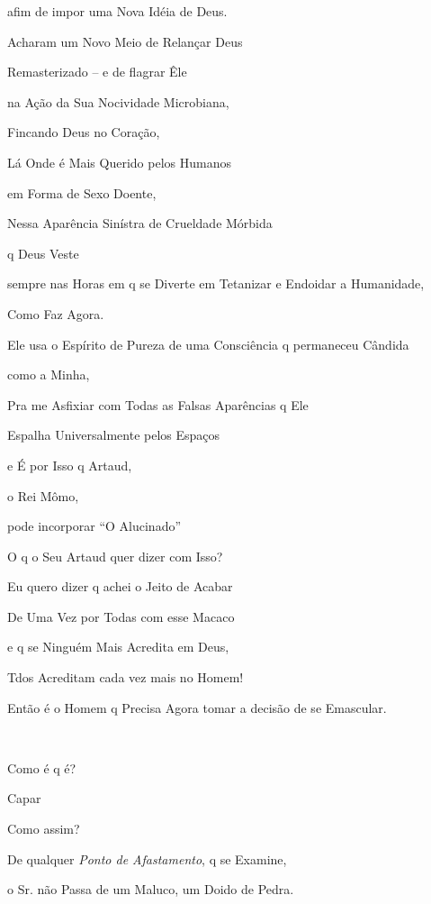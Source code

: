 afim de impor uma Nova Idéia de Deus.

Acharam um Novo Meio de Relançar Deus 

Remasterizado -- e de flagrar Êle

na Ação da Sua Nocividade Microbiana,

Fincando Deus no Coração,

Lá Onde é Mais Querido pelos Humanos

em Forma de Sexo Doente,

Nessa Aparência Sinístra de Crueldade Mórbida

q Deus Veste

sempre nas Horas em q se Diverte em Tetanizar
e Endoidar a Humanidade,

Como Faz Agora.

Ele usa o Espírito de Pureza de uma Consciência q permaneceu Cândida

como a Minha,

Pra me Asfixiar com Todas as Falsas Aparências q Ele

Espalha Universalmente pelos Espaços

e É por Isso q Artaud,

o Rei Mômo,

pode incorporar ``O Alucinado''



O q o Seu Artaud quer dizer com Isso?


Eu quero dizer q achei o Jeito de Acabar

De Uma Vez por Todas com esse Macaco

e q se Ninguém Mais Acredita em Deus,

Tdos Acreditam cada vez mais no Homem!

Então é o Homem q Precisa Agora tomar a decisão de se Emascular.

~


Como é q é?


Capar


Como assim? \EP[3]

De qualquer \emph{Ponto de Afastamento}, q se Examine,

o Sr. não Passa de um Maluco, um Doido de Pedra.

